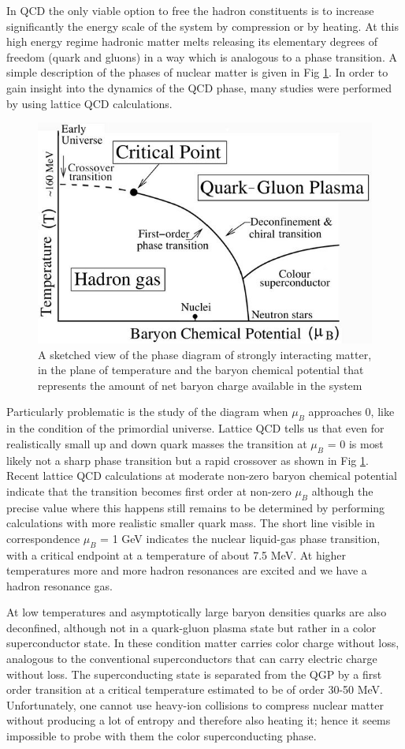 \documentclass[12pt,a4paper]{book}
\begin{document}
	 In QCD the only viable option to free the hadron constituents is to increase significantly the energy scale of the system by compression or by heating. At this high energy regime hadronic matter melts releasing its elementary degrees of freedom (quark and gluons) in a way which is analogous to a phase transition. A simple description of the phases of nuclear matter is given in Fig \ref{fig:QCD_phase_diagram}. In order to gain insight into the dynamics of the QCD phase, many studies were performed by using lattice QCD calculations. 
	\begin{figure}[ht]
		\centering
		\includegraphics[width=0.7\linewidth]{pictures/QCD_phase_diagram.jpg}
		\caption{A sketched view of the phase diagram of strongly interacting matter, in the plane of temperature and the baryon chemical potential that represents the amount of net baryon charge available in the system \cite{QCDPhase-Diagram}}
		\label{fig:QCD_phase_diagram} 
	\end{figure}
	 Particularly problematic is the study of the diagram when $\mu_B$ approaches 0, like in the condition of the primordial universe. Lattice QCD tells us that even for realistically small up and down quark masses the transition at $\mu_B$ = 0 is most likely not a sharp phase transition but a rapid crossover as shown in Fig \ref{fig:QCD_phase_diagram}. Recent lattice QCD calculations at moderate non-zero baryon chemical potential indicate that the transition becomes first order at non-zero $\mu_B$ although the precise value where this happens still remains to be determined by performing calculations with more realistic smaller quark mass. The short line visible in correspondence $\mu_B$ = 1 GeV indicates the nuclear liquid-gas	phase transition, with a critical endpoint at a temperature of about 7.5 MeV. At higher temperatures	more and more hadron resonances are excited and we have a hadron resonance gas.
	 
	  At low temperatures and asymptotically large baryon densities quarks are also deconfined, although not in a quark-gluon plasma state but rather in a color superconductor state. In these condition matter carries color charge without loss, analogous to the conventional superconductors that can carry electric charge without loss. The superconducting state is separated from the QGP by a first order transition at a critical temperature estimated to be of order 30-50 MeV. Unfortunately, one cannot use heavy-ion collisions to compress nuclear matter without producing a lot of entropy and therefore also heating it; hence it seems impossible to probe with them the color superconducting phase. 
	  
\end{document}
